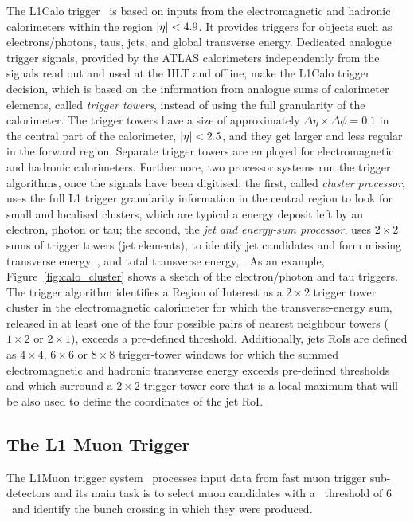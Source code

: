 			The \ac{L1Calo} trigger~\cite{ATLASJINST, ATLASL1CaloTrig} is based on inputs from the electromagnetic and hadronic calorimeters within the region $|\eta|<4.9$. It provides triggers for objects such as electrons/photons, taus, jets, and global transverse energy. Dedicated analogue trigger signals, provided by the \ac{ATLAS} calorimeters independently from the signals read out and used at the \ac{HLT} and offline, make the \ac{L1Calo} trigger decision, which is based on the information from analogue sums of calorimeter elements, called \emph{trigger towers}, instead of using the full granularity of the calorimeter. The trigger towers have a size of approximately $\Delta \eta \times \Delta \phi = 0.1$ in the central part of the calorimeter, $|\eta| < 2.5$, and they get larger and less regular in the forward region. Separate trigger towers are employed for electromagnetic and hadronic calorimeters. Furthermore, two processor systems run the trigger algorithms, once the signals have been digitised: the first, called \emph{cluster processor}, uses the full \ac{L1} trigger granularity information in the central region to look for small and localised clusters, which are typical a energy deposit left by an electron, photon or tau; the second, the \emph{jet and energy-sum processor}, uses $2 \times 2$ sums of trigger towers (jet elements), to identify jet candidates and form missing transverse energy, \met, and total transverse energy, \et. As an example, Figure~\ref{fig:calo_cluster} shows a sketch of the electron/photon and tau triggers. The trigger algorithm identifies a Region of Interest as a $2 \times 2$ trigger tower cluster in the electromagnetic calorimeter for which the transverse-energy sum, released in at least one of the four possible pairs of nearest neighbour towers ($1 \times 2$ or $2 \times 1$), exceeds a pre-defined threshold. Additionally, jets \ac{RoI}s are defined as $4 \times 4$, $6 \times 6$ or $8 \times 8$ trigger-tower windows for which the summed electromagnetic and hadronic transverse energy exceeds pre-defined thresholds and which surround a $2 \times 2$ trigger tower core that is a local maximum that will be also used to define the coordinates of the jet \ac{RoI}.


		\subsection*{The L1 Muon Trigger}

			The \ac{L1Muon} trigger system~\cite{ATLASPerf08} processes input data from fast muon trigger sub-detectors and its main task is to select muon candidates with a \pt\ threshold of 6 \GeV\ and identify the bunch crossing in which they were produced.

